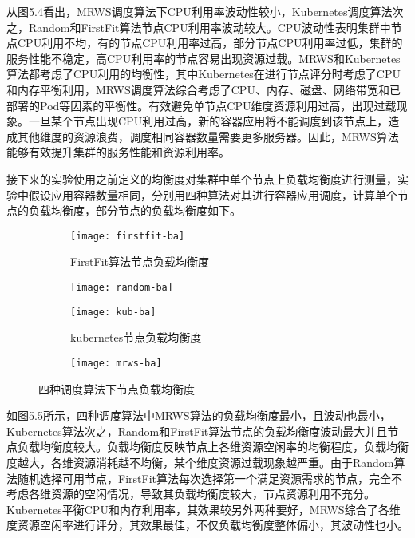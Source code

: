 从图5.4看出，MRWS调度算法下CPU利用率波动性较小，Kubernetes调度算法次之，Random和FirstFit算法节点CPU利用率波动较大。CPU波动性表明集群中节点CPU利用不均，有的节点CPU利用率过高，部分节点CPU利用率过低，集群的服务性能不稳定，高CPU利用率的节点容易出现资源过载。MRWS和Kubernetes算法都考虑了CPU利用的均衡性，其中Kubernetes在进行节点评分时考虑了CPU和内存平衡利用，MRWS调度算法综合考虑了CPU、内存、磁盘、网络带宽和已部署的Pod等因素的平衡性。有效避免单节点CPU维度资源利用过高，出现过载现象。一旦某个节点出现CPU利用过高，新的容器应用将不能调度到该节点上，造成其他维度的资源浪费，调度相同容器数量需要更多服务器。因此，MRWS算法能够有效提升集群的服务性能和资源利用率。

接下来的实验使用之前定义的均衡度对集群中单个节点上负载均衡度进行测量，实验中假设应用容器数量相同，分别用四种算法对其进行容器应用调度，计算单个节点的负载均衡度，部分节点的负载均衡度如下。

\begin{figure}[H]
	\centering%
	\begin{subfigure}{7cm}
		\texttt{[image: firstfit-ba]}
		\caption{FirstFit算法节点负载均衡度}
	\end{subfigure}%
	\hspace{0.5cm}%
	\begin{subfigure}{7cm}
		\texttt{[image: random-ba]}
	\end{subfigure}
	\begin{subfigure}{7cm}
		\texttt{[image: kub-ba]}
		\caption{kubernetes节点负载均衡度}
	\end{subfigure}%
	\hspace{0.5cm}%
	\begin{subfigure}{7cm}
		\texttt{[image: mrws-ba]}
	\end{subfigure}
	\caption{四种调度算法下节点负载均衡度}
	
\end{figure}

如图5.5所示，四种调度算法中MRWS算法的负载均衡度最小，且波动也最小，Kubernetes算法次之，Random和FirstFit算法节点的负载均衡度波动最大并且节点负载均衡度较大。负载均衡度反映节点上各维资源空闲率的均衡程度，负载均衡度越大，各维资源消耗越不均衡，某个维度资源过载现象越严重。由于Random算法随机选择可用节点，FirstFit算法每次选择第一个满足资源需求的节点，完全不考虑各维资源的空闲情况，导致其负载均衡度较大，节点资源利用不充分。Kubernetes平衡CPU和内存利用率，其效果较另外两种要好，MRWS综合了各维度资源空闲率进行评分，其效果最佳，不仅负载均衡度整体偏小，其波动性也小。

